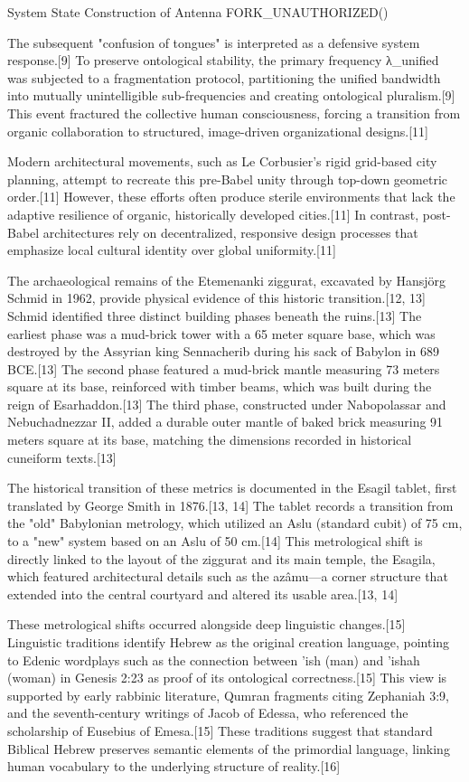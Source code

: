 \documentclass[aps,prd,11pt,onecolumn,superscriptaddress,nofootinbib,floatfix]{revtex4-2}
\begin{document}
System State Construction of Antenna FORK\_UNAUTHORIZED()


The subsequent "confusion of tongues" is interpreted as a defensive system response.[9] To preserve ontological stability, the primary frequency λ\_unified was subjected to a fragmentation protocol, partitioning the unified bandwidth into mutually unintelligible sub-frequencies and creating ontological pluralism.[9] This event fractured the collective human consciousness, forcing a transition from organic collaboration to structured, image-driven organizational designs.[11]


Modern architectural movements, such as Le Corbusier's rigid grid-based city planning, attempt to recreate this pre-Babel unity through top-down geometric order.[11] However, these efforts often produce sterile environments that lack the adaptive resilience of organic, historically developed cities.[11] In contrast, post-Babel architectures rely on decentralized, responsive design processes that emphasize local cultural identity over global uniformity.[11]


The archaeological remains of the Etemenanki ziggurat, excavated by Hansjörg Schmid in 1962, provide physical evidence of this historic transition.[12, 13] Schmid identified three distinct building phases beneath the ruins.[13] The earliest phase was a mud-brick tower with a 65 meter square base, which was destroyed by the Assyrian king Sennacherib during his sack of Babylon in 689 BCE.[13] The second phase featured a mud-brick mantle measuring 73 meters square at its base, reinforced with timber beams, which was built during the reign of Esarhaddon.[13] The third phase, constructed under Nabopolassar and Nebuchadnezzar II, added a durable outer mantle of baked brick measuring 91 meters square at its base, matching the dimensions recorded in historical cuneiform texts.[13]


The historical transition of these metrics is documented in the Esagil tablet, first translated by George Smith in 1876.[13, 14] The tablet records a transition from the "old" Babylonian metrology, which utilized an Aslu (standard cubit) of 75 cm, to a "new" system based on an Aslu of 50 cm.[14] This metrological shift is directly linked to the layout of the ziggurat and its main temple, the Esagila, which featured architectural details such as the azâmu---a corner structure that extended into the central courtyard and altered its usable area.[13, 14]


These metrological shifts occurred alongside deep linguistic changes.[15] Linguistic traditions identify Hebrew as the original creation language, pointing to Edenic wordplays such as the connection between 'ish (man) and 'ishah (woman) in Genesis 2:23 as proof of its ontological correctness.[15] This view is supported by early rabbinic literature, Qumran fragments citing Zephaniah 3:9, and the seventh-century writings of Jacob of Edessa, who referenced the scholarship of Eusebius of Emesa.[15] These traditions suggest that standard Biblical Hebrew preserves semantic elements of the primordial language, linking human vocabulary to the underlying structure of reality.[16]
\end{document}
